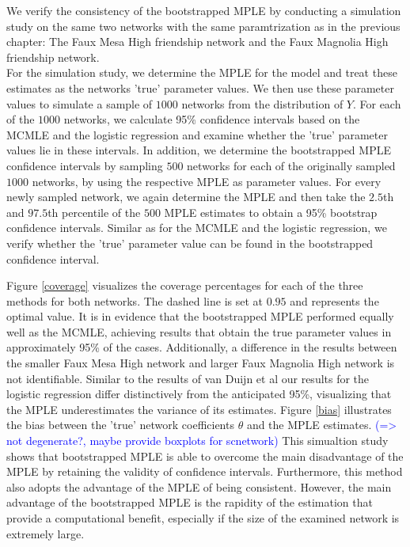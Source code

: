 \documentclass[headsepline=true, abstracton]{scrartcl}
\begin{document}
\noindent We verify the consistency of the bootstrapped MPLE by conducting a simulation study on the same two networks with the same paramtrization as in the previous chapter: The Faux Mesa High friendship network and the Faux Magnolia High friendship network. \\[0.3cm]
For the simulation study, we determine the MPLE for the model and treat these estimates as the networks 'true' parameter values. We then use these parameter values to simulate a sample of $1000$ networks from the distribution of $Y$. For each of the $1000$ networks, we calculate 95\% confidence intervals based on the MCMLE and the logistic regression and examine whether the 'true' parameter values lie in these intervals. In addition, we determine the bootstrapped MPLE confidence intervals by sampling $500$ networks for each of the originally sampled $1000$ networks, by using the respective MPLE as parameter values. For every newly sampled network, we again determine the MPLE and then take the $2.5$th and $97.5$th percentile of the $500$ MPLE estimates to obtain a 95\% bootstrap confidence intervals. Similar as for the MCMLE and the logistic regression, we verify whether the 'true' parameter value can be found in the bootstrapped confidence interval. 



\noindent Figure \ref{coverage} visualizes the coverage percentages for each of the three methods for both networks. The dashed line is set at $0.95$ and represents the optimal value. It is in evidence that the bootstrapped MPLE performed equally well as the MCMLE, achieving results that obtain the true parameter values in approximately 95\% of the cases. Additionally, a difference in the results between the smaller Faux Mesa High network and larger Faux Magnolia High network is not identifiable. Similar to the results of van Duijn et al \cite{vanDuijnetal2009} our results for the logistic regression differ distinctively from the anticipated 95\%, visualizing that the MPLE underestimates the variance of its estimates.
Figure \ref{bias} illustrates the bias between the 'true' network coefficients $\theta$ and the MPLE estimates. \textcolor{blue}{(=> not degenerate?, maybe provide boxplots for scnetwork)}
\noindent This simualtion study shows that bootstrapped MPLE is able to overcome the main disadvantage of the MPLE by retaining the validity of confidence intervals. Furthermore, this method also adopts the advantage of the MPLE of being consistent. However, the main advantage of the bootstrapped MPLE is the rapidity of the estimation that provide a computational benefit, especially if the size of the examined network is extremely large.
\end{document}
